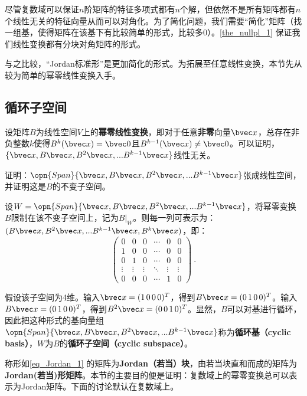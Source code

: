 

尽管复数域可以保证$n$阶矩阵的特征多项式都有$n$个解，但依然不是所有矩阵都有$n$个线性无关的特征向量从而可以对角化。为了简化问题，我们需要“简化”矩阵（找一组基，使得矩阵在该基下有比较简单的形式，比较多$0$）。\autoref{the_nullpl_1} 保证我们线性变换都有分块对角矩阵的形式。

与之比较，“Jordan标准形”是更加简化的形式。为拓展至任意线性变换，本节先从较为简单的幂零线性变换入手。
\subsection{循环子空间}
设矩阵$B$为线性空间$V$上的\textbf{幂零线性变换}，即对于任意\textbf{非零}向量$\bvec x$，总存在非负整数$k$使得$B^{k}(\bvec x)=\bvec 0$且$B^{k-1}(\bvec x)\neq \bvec 0$。可以证明，$\{\bvec x,B\bvec x,B^2\bvec x,...B^{k-1}\bvec x\}$线性无关。
\begin{exercise}{}
证明：$\opn{Span}\{\bvec x,B\bvec x,B^2\bvec x,...B^{k-1}\bvec x\}$张成线性空间，并证明这是$B$的不变子空间。
\end{exercise}
设$W=\opn{Span}\{\bvec x,B\bvec x,B^2\bvec x,...B^{k-1}\bvec x\}$，将幂零变换$B$限制在该不变子空间上，记为$B|_W$。则每一列可表示为：$(B\bvec x,B^2\bvec x,...B^{k-1}\bvec x,B^k\bvec x)$，即：
\begin{equation}\label{eq_Jordan_1}
\left(\begin{array}{cccccc}
0 & 0 & 0 & \cdots & 0 & 0 \\
1 & 0 & 0 & \cdots & 0 & 0 \\
0 & 1 & 0 & \cdots & 0 & 0 \\
\vdots & \vdots & \vdots & \ddots & \vdots & \vdots \\
0 & 0 & 0 & \cdots & 1 & 0
\end{array}\right)~.
\end{equation}

假设该子空间为4维。输入$\bvec x=(1\,0\,0\,0)^T$，得到$B\bvec x=(0\,1\,0\,0)^T$。输入$B\bvec x=(0\,1\,0\,0)^T$，得到$B^2\bvec x=(0\,0\,1\,0)^T$。显然，$B$可以对基进行循环，因此把这种形式的基向量组$\opn{Span}\{\bvec x,B\bvec x,B^2\bvec x,...B^{k-1}\bvec x\}$称为\textbf{循环基（cyclic basis）}，$W$为$B$的\textbf{循环子空间（cyclic subspace）}。

称形如\autoref{eq_Jordan_1} 的矩阵为\textbf{Jordan（若当）块}，由若当块直和而成的矩阵为\textbf{ Jordan(若当)形矩阵}。本节的主要目的便是证明：复数域上的幂零变换总可以表示为Jordan矩阵。下面的讨论默认在复数域上。


